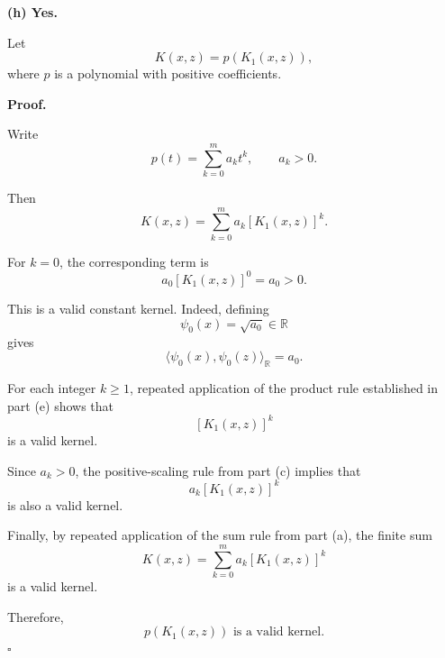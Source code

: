 \documentclass[11pt]{article}
\begin{document}
\bigskip
\noindent\textbf{(h) Yes.}

Let
\[
K(x,z)=p(K_1(x,z)),
\]
where $p$ is a polynomial with positive coefficients.

\textbf{Proof.}

Write
\[
p(t)=\sum_{k=0}^{m}a_kt^k,
\qquad a_k>0.
\]

Then
\[
K(x,z)
=
\sum_{k=0}^{m}a_k[K_1(x,z)]^k.
\]

For $k=0$, the corresponding term is
\[
a_0[K_1(x,z)]^0=a_0>0.
\]

This is a valid constant kernel. Indeed, defining
\[
\psi_0(x)=\sqrt{a_0}\in\mathbb R
\]
gives
\[
\langle\psi_0(x),\psi_0(z)\rangle_{\mathbb R}
=a_0.
\]

For each integer $k\geq1$, repeated application
of the product rule established in part (e)
shows that
\[
[K_1(x,z)]^k
\]
is a valid kernel.

Since $a_k>0$, the positive-scaling rule from
part (c) implies that
\[
a_k[K_1(x,z)]^k
\]
is also a valid kernel.

Finally, by repeated application of the sum rule
from part (a), the finite sum
\[
K(x,z)=
\sum_{k=0}^{m}a_k[K_1(x,z)]^k
\]
is a valid kernel.

Therefore,
\[
\boxed{
p(K_1(x,z))\text{ is a valid kernel.}
}
\]
\hfill$\square$
\end{document}
